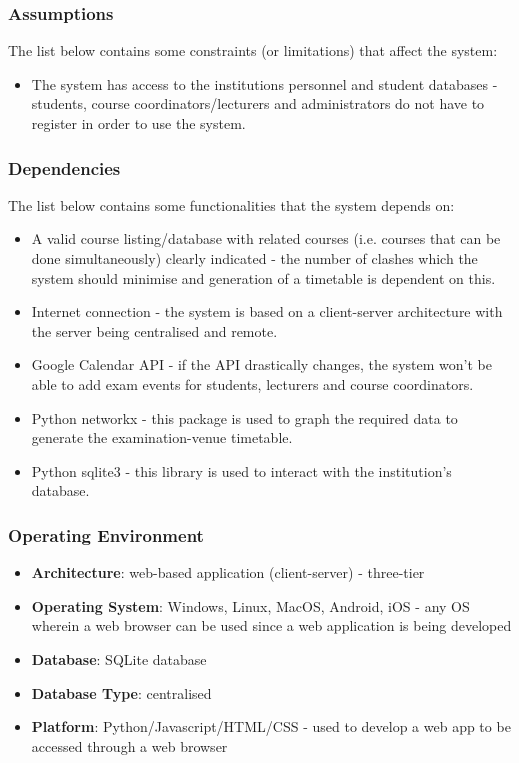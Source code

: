 \documentclass{article}
\begin{document}
\subsubsection{Assumptions}

The list below contains some constraints (or limitations) that affect the system:

\begin{itemize}
\item The system has access to the institutions personnel and student databases - students, course coordinators/lecturers and administrators do not have to register in order to use the system.
\end{itemize}

\subsubsection{Dependencies}

The list below contains some functionalities that the system depends on:

\begin{itemize}
\item A valid course listing/database with related courses (i.e. courses that can be done simultaneously) clearly indicated - the number of clashes which the system should minimise and generation of a timetable is dependent on this.
\item Internet connection - the system is based on a client-server architecture with the server being centralised and remote.
\item Google Calendar API - if the API drastically changes, the system won't be able to add exam events for students, lecturers and course coordinators.
\item Python networkx - this package is used to graph the required data to generate the examination-venue timetable.
\item Python sqlite3 - this library is used to interact with the institution's database.
\end{itemize}

\subsubsection{Operating Environment}

\begin{itemize}
\item \textbf{Architecture}: web-based application (client-server) - three-tier
\item \textbf{Operating System}: Windows, Linux, MacOS, Android, iOS - any OS wherein a web browser can be used since a web application is being developed
\item \textbf{Database}: SQLite database
\item \textbf{Database Type}: centralised
\item \textbf{Platform}: Python/Javascript/HTML/CSS - used to develop a web app to be accessed through a web browser
\end{itemize}
\end{document}
